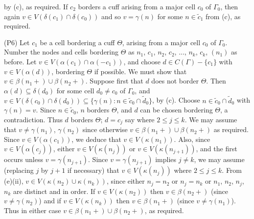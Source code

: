 \noindent by (c), as required. If $c_2$ borders a cuff arising from a major cell $c_0$ of $\Gamma_0$, then again $v \in V(\delta(c_1) \cap \delta(c_0))$ and so $v = \gamma(n)$ for some $n \in \tilde{c}_1$ from (c), as required.

\hspace*{12pt}(P6) Let $c_1$ be a cell bordering a cuff $\Theta$, arising from a major cell $c_0$ of $\Gamma_0$. Number the nodes and cells bordering $\Theta$ as $n_1$, $c_1$, $n_2$, $c_2$, ..., $n_k$, $c_k$, $(n_1)$ as before. Let $v \in V(\alpha(c_1) \cap \alpha(-c_1))$, and choose $d \in C(\Gamma) - \{c_1\}$ with $v \in V(\alpha(d))$, bordering $\Theta$ if possible. We must show that $v \in \beta(n_1 +) \cup \beta(n_2 +)$. Suppose first that $d$ does not border $\Theta$. Then $\alpha(d) \subseteq \delta(d_0)$ for some cell $d_0 \ne c_0$ of $\Gamma_0$, and $v \in V(\delta(c_0) \cap \delta(d_0)) \subseteq \{\gamma(n) \colon n \in \tilde{c}_0 \cap \tilde{d}_0\}$, by (c). Choose $n \in \tilde{c}_0 \cap \tilde{d}_0$ with $\gamma(n) = v$. Since $n \in \tilde{c}_0$, $n$ borders $\Theta$, and $d$ can be chosen bordering $\Theta$, a contradiction. Thus $d$ borders $\Theta$; $d = c_j$ say where $2 \le j \le k$. We may assume that $v \ne \gamma(n_1)$, $\gamma(n_2)$ since otherwise $v \in \beta(n_1 +) \cup \beta(n_2 +)$ as required. Since $v \in V(\alpha(c_1))$, we deduce that $v \in V(\kappa(n_1))$. Also, since $v \in V(\alpha(c_j))$, either $v \in V(\kappa(n_j))$ or $v \in V(\kappa(n_{j+1}))$, and the first occurs unless $v = \gamma(n_{j+1})$. Since $v = \gamma(n_{j+1})$ implies $j \ne k$, we may assume (replacing $j$ by $j+1$ if necessary) that $v \in V(\kappa(n_j))$ where $2 \le j \le k$. From (e)(ii), $v \in V(\kappa(n_2) \cup \kappa(n_k))$, since either $n_j = n_2$ or $n_j = n_k$ or $n_1$, $n_2$, $n_j$, $n_k$ are distinct and in order. If $v \in V(\kappa(n_2))$ then $v \in \beta(n_2 +)$ (since $v \ne \gamma(n_2)$) and if $v \in V(\kappa(n_k))$ then $v \in \beta(n_1 +)$ (since $v \ne \gamma(n_1)$). Thus in either case $v \in \beta(n_1 +) \cup \beta(n_2 +)$, as required.

